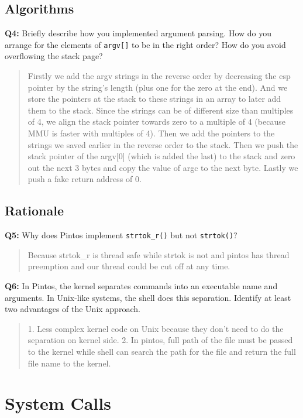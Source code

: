 \documentclass[a4paper,11pt]{paper}
\begin{document}
\subsection{Algorithms}


\textbf{Q4:} Briefly describe how you implemented argument parsing.  How do you arrange for the elements of \texttt{argv[]} to be in the right order? How do you avoid overflowing the stack page?

\begin{quote}
  Firstly we add the argv strings in the reverse order by decreasing the esp pointer by the string's length (plus one for the zero at the end). And we store the pointers at the stack to these strings in an array to later add them to the stack. Since the strings can be of different size than multiples of 4, we align the stack pointer towards zero to a multiple of 4 (because MMU is faster with multiples of 4). Then we add the pointers to the strings we saved earlier in the reverse order to the stack. Then we push the stack pointer of the argv[0] (which is added the last) to the stack and zero out the next 3 bytes and copy the value of argc to the next byte. Lastly we push a fake return address of 0. 
\end{quote}

\subsection{Rationale}

\textbf{Q5:} Why does Pintos implement \texttt{strtok\_r()} but not \texttt{strtok()}?
\begin{quote}
  Because strtok\_r is thread safe while strtok is not and pintos has thread preemption and our thread could be cut off at any time.
\end{quote}

\textbf{Q6:} In Pintos, the kernel separates commands into an executable name and arguments.  In Unix-like systems, the shell does this separation.  Identify at least two advantages of the Unix approach.
\begin{quote}
    1. Less complex kernel code on Unix because they don't need to do the separation on kernel side.
    2. In pintos, full path of the file must be passed to the kernel while shell can search the path for the file and return the full file name to the kernel.
\end{quote}


\section{System Calls}
\end{document}
